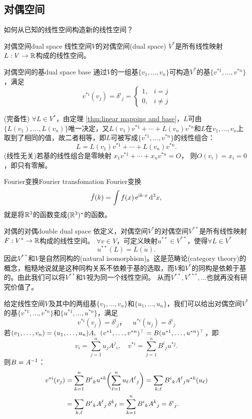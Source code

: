 \subsection{对偶空间}
如何从已知的线性空间构造新的线性空间？
\begin{definition}{对偶空间}{dual space}
	线性空间$V$的对偶空间(dual space) $V^\ast$是所有线性映射$L:V\to\mathbb R$构成的线性空间。
\end{definition}
\begin{theorem}{对偶空间的基}{dual space base}
	通过$V$的一组基$\{v_1,\ldots,v_n\}$可构造$V^\ast$的基$\{v^{\ast 1},\ldots,v^{\ast n}\}$，满足
	\begin{equation}
		v^{\ast i}(v_j)=\delta^i{}_j=
		\begin{cases}
			1,&i=j\\0,&i\neq j
		\end{cases}
	\end{equation}
\end{theorem}
\prf 
(完备性) $\forall L\in V^\ast$，由定理 \ref{thm:linear mapping and base}，$L$可由$\{L(v_1),\ldots,L(v_n)\}$唯一决定，又$L(v_1)v^{\ast 1}+\cdots+L(v_n)v^{\ast n}$和$L$在$v_1,\ldots,v_n$上取到了相同的值，故二者相等，即$L$可被写成$\{v^{\ast 1},\ldots,v^{\ast n}\}$的线性组合：
\[
	L=L(v_1)v^{\ast 1}+\cdots+L(v_n)v^{\ast n}.
\]
(线性无关)若基的线性组合是零映射
$x_1v^{\ast 1}+\cdots+x_nv^{\ast n}=O$，
则$O(v_i)=x_i=0$，即只有零解。
\begin{example}{Fourier变换}{Fourier transfomation}
	Fourier变换
	\[
		\hat f(k)=\int f(x)\mathop{}\!\mathrm{e}^{\mathrm{i} k\cdot x}\mathop{}\!\mathrm{d}^3x,
	\]
	就是将$\mathbb R^3$的函数变成$(\mathbb R^3)^\ast$的函数。
\end{example}
\begin{example}{对偶的对偶}{double dual space}
	依定义，对偶空间$V^\ast$的对偶空间$V^{\ast\ast}$是所有线性映射$F:V^\ast\to\mathbb R$构成的线性空间。%
	$\forall v\in V$，可定义映射$u^{\ast\ast}\in V^{\ast\ast}$，使得$\forall L\in V^\ast$
	\[
		u^{\ast\ast}(L)=L(u).
	\]
	因此$V^{\ast\ast}$和$V$是自然同构的(natural isomorphism)。这是范畴论(category theory)的概念，粗糙地说就是这种同构关系不依赖于基的选取，而$V$和$V^\ast$的同构是依赖于基的。由此我们可以将$V^{\ast\ast}$和$V$视为同一个线性空间。
	从而$V^{\ast\ast},V^{\ast\ast\ast},\ldots$也就再没有研究价值了。
\end{example}
给定线性空间$V$及其中的两组基$\{v_1,\ldots,v_n\}$和$\{u_1,\ldots,u_n\}$，我们可以给出对偶空间$V^\ast$的基$\{v^{\ast 1},\ldots,v^{\ast n}\}$和$\{u^{\ast 1},\ldots,u^{\ast n}\}$，满足
\[
	v^{\ast i}(v_j)=\delta^i{}_j，\quad u^{\ast i}(u_j)=\delta^i{}_j
\]
若$(v_1,\ldots,v_n)=(u_1,\ldots,u_n)A,\enspace(v^{\ast 1},\ldots,v^{\ast n})^\top=B(u^{\ast 1},\ldots,u^{\ast n})^\top$，即 
\[
	v_i=\sum_{j=1}^nu_jA^j{}_i,\quad v^{\ast i}=\sum_{j=1}^nB^i{}_ju^{\ast j}.
\]
则$B=A^{-1}$：
\begin{align*}
	v^{\ast i}(v_j)&=\sum_{k=1}^nB^i{}_ku^{\ast k}\biggl(\sum_{\ell=1}^n u_\ell A^\ell{}_j\biggr)=\sum_{k,\ell}B^i{}_kA^\ell{}_ju^{\ast k}(u_\ell)\\
	&=\sum_{k,\ell}B^i{}_kA^\ell{}_j\mathop{}\!\delta^k{}_\ell=\sum_{k=1}^nB^i{}_kA^k{}_j=\delta^i{}_j.
\end{align*}
